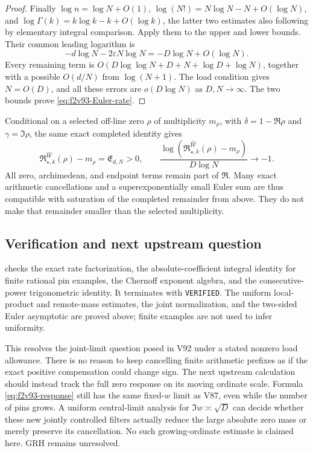 \documentclass[11pt]{article}
\theoremstyle{definition}
\theoremstyle{remark}
\begin{document}
\begin{proof}
Finally \(\log n=\log N+O(1)\),
\(\log(N!)=N\log N-N+O(\log N)\), and
\(\log\Gamma(k)=k\log k-k+O(\log k)\), the latter two
estimates also following by elementary integral comparison.
Apply them to the upper and lower bounds.  Their common leading
logarithm is
\[
 -d\log N-2\varepsilon N\log N
 =-D\log N+O(\log N).
\]
Every remaining term is
\(O(D\log\log N+D+N+\log D+\log N)\), together with a
possible \(O(d/N)\) from \(\log(N+1)\).  The load condition
gives \(N=O(D)\), and all these errors are \(o(D\log N)\)
as \(D,N\to\infty\).  The two bounds prove
\eqref{eq:f2v93-Euler-rate}.
\end{proof}

Conditional on a selected off-line zero \(\rho\) of multiplicity
\(m_\rho\), with \(\delta=1-\Re\rho\) and
\(\gamma=\Im\rho\), the same exact completed identity gives
\begin{equation}
 \mathfrak R_{\star,k}^{\widehat W}(\rho)-m_\rho
 =\mathfrak E_{d,N}>0,
 \qquad
 \frac{\log(\mathfrak R_{\star,k}^{\widehat W}(\rho)-m_\rho)}
      {D\log N}\longrightarrow-1.
 \label{eq:f2v93-completed}
\end{equation}
All zero, archimedean, and endpoint terms remain part of
\(\mathfrak R\).  Many exact arithmetic cancellations and a
superexponentially small Euler sum are thus compatible with saturation
of the completed remainder from above.  They do not make that remainder
smaller than the selected multiplicity.

\subsection*{Verification and next upstream question}

 checks the exact
rate factorization, the absolute-coefficient integral identity for
finite rational pin examples, the Chernoff exponent algebra, and the
consecutive-power trigonometric identity.  It terminates with
\texttt{VERIFIED}.  The uniform local-product and remote-mass estimates,
the joint normalization, and the two-sided Euler asymptotic are proved
above; finite examples are not used to infer uniformity.

This resolves the joint-limit question posed in V92 under a stated
nonzero load allowance.  There is no reason to keep cancelling finite
arithmetic prefixes as if the exact positive compensation could change
sign.  The next upstream calculation should instead track the full
zero response on its moving ordinate scale.  Formula
\eqref{eq:f2v93-response} still has the same fixed-\(w\) limit as
V87, even while the number of pins grows.  A uniform central-limit
analysis for \(\Im w\asymp\sqrt D\) can decide whether these new
jointly controlled filters actually reduce the large absolute zero
mass or merely preserve its cancellation.  No such growing-ordinate
estimate is claimed here.  GRH remains unresolved.
\end{document}
